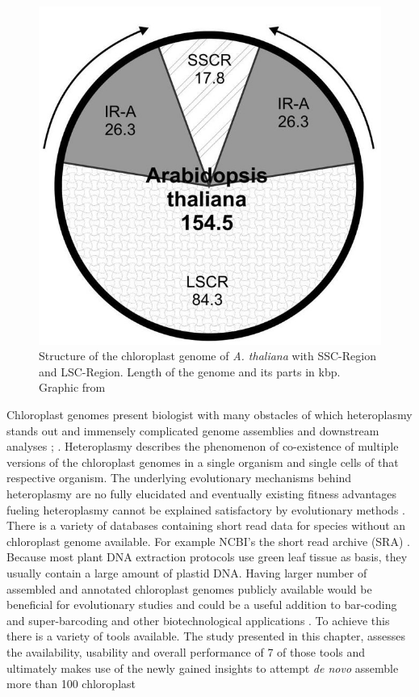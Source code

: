 \begin{figure}[H]
\centering
\includegraphics[height=.55\textheight, width=.95\textwidth]{Figures/cpast}
\decoRule
\caption[Structure of a chloroplast genome]{Structure of the chloroplast genome of \textit{A. thaliana} with SSC-Region and LSC-Region. Length of the genome and its parts in kbp. Graphic from \cite{olejniczak2016chloroplasts}}
\label{fig:cpast_genome}
\end{figure}

Chloroplast genomes present biologist with many obstacles of which heteroplasmy stands out and immensely
complicated genome assemblies and downstream analyses \cite{corriveau_1988}; \cite{Chat2002}.  Heteroplasmy
describes the phenomenon of co-existence of multiple versions of the chloroplast genomes in a single organism
and single cells of that respective organism. The underlying evolutionary mechanisms behind heteroplasmy are no
fully elucidated and eventually existing fitness advantages fueling heteroplasmy cannot be explained
satisfactory by evolutionary methods \cite{Scar2016}.
There is a variety of databases containing short read data for species without an chloroplast genome available. For example NCBI's the short read archive (SRA) \cite{SRA2010}. Because most plant DNA extraction protocols use green leaf tissue as basis, they usually contain a large amount of plastid DNA. Having  larger number of assembled and annotated chloroplast genomes publicly available would be beneficial for evolutionary studies and could be a useful addition to bar-coding and super-barcoding \cite{coissac_barcodes_2016} and other biotechnological applications \cite{daniell_chloroplast_2016}. To achieve this there is a variety of tools available. The study presented in this chapter, assesses the availability, usability and overall performance of 7 of those tools and ultimately makes use of the newly gained insights to attempt \textit{de novo} assemble more than 100 chloroplast





